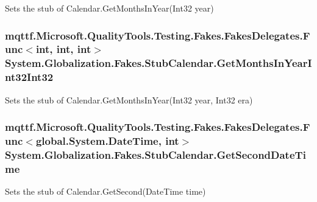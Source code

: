 Sets the stub of Calendar.\-Get\-Months\-In\-Year(\-Int32 year)

\hypertarget{class_system_1_1_globalization_1_1_fakes_1_1_stub_calendar_a3fb92cf91327ffaa04caa55f25961652}{
\subsubsection[{Get\-Months\-In\-Year\-Int32\-Int32}]{\setlength{\rightskip}{0pt plus 5cm}mqttf.\-Microsoft.\-Quality\-Tools.\-Testing.\-Fakes.\-Fakes\-Delegates.\-Func$<$int, int, int$>$ System.\-Globalization.\-Fakes.\-Stub\-Calendar.\-Get\-Months\-In\-Year\-Int32\-Int32}}\label{class_system_1_1_globalization_1_1_fakes_1_1_stub_calendar_a3fb92cf91327ffaa04caa55f25961652}


Sets the stub of Calendar.\-Get\-Months\-In\-Year(\-Int32 year, Int32 era)

\hypertarget{class_system_1_1_globalization_1_1_fakes_1_1_stub_calendar_a8a6e91ba959bb49a08e6d847e71fc9c2}{
\subsubsection[{Get\-Second\-Date\-Time}]{\setlength{\rightskip}{0pt plus 5cm}mqttf.\-Microsoft.\-Quality\-Tools.\-Testing.\-Fakes.\-Fakes\-Delegates.\-Func$<$global.\-System.\-Date\-Time, int$>$ System.\-Globalization.\-Fakes.\-Stub\-Calendar.\-Get\-Second\-Date\-Time}}\label{class_system_1_1_globalization_1_1_fakes_1_1_stub_calendar_a8a6e91ba959bb49a08e6d847e71fc9c2}


Sets the stub of Calendar.\-Get\-Second(\-Date\-Time time)

